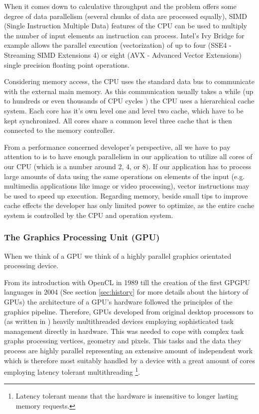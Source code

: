 When it comes down to calculative throughput and the problem offers some degree of data parallelism (several chunks of data are processed equally), SIMD (Single Instruction Multiple Data) features of the CPU can be used to multiply the number of input elements an instruction can process. Intel's Ivy Bridge for example allows the parallel execution (vectorization) of up to four (SSE4 - Streaming SIMD Extensions 4) or eight (AVX - Advanced Vector Extensions) single precision floating point operations.

Considering memory access, the CPU uses the standard data bus to communicate with the external main memory. As this communication usually takes a while (up to hundreds or even thousands of CPU cycles  \cite[p. 54]{opencl_book}) the CPU uses a hierarchical cache system. Each core has it's own level one and level two cache, which have to be kept synchronized. All cores share a common level three cache that is then connected to the memory controller.

From a performance concerned developer's perspective, all we have to pay attention to is to have enough parallelism in our application to utilize all cores of our CPU (which is a number around 2, 4, or 8). If our application has to process large amounts of data using the same operations on elements of the input (e.g. multimedia applications like image or video processing), vector instructions may be used to speed up execution. Regarding memory, beside small tips to improve cache effects the developer has only limited power to optimize, as the entire cache system is controlled by the CPU and operation system. 


\subsubsection{The Graphics Processing Unit (GPU)}

When we think of a GPU we think of a highly parallel graphics orientated processing device.

From its introduction with OpenCL in 1989 till the creation of the first GPGPU languages in 2004 (See section \ref{sec:history} for more details about the history of GPUs) the architecture of a GPU's hardware followed the principles of the graphics pipeline. Therefore, GPUs developed from original desktop processors to (as written in \cite{opencl_book}) heavily multithreaded devices employing sophisticated task management directly in hardware. This was needed to cope with complex task graphs processing vertices, geometry and pixels. This tasks and the data they process are highly parallel representing an extensive amount of independent work which is therefore most suitably handled by a device with a great amount of cores employing latency tolerant multithreading \footnote{Latency tolerant means that the hardware is insensitive to longer lasting memory requests.}.

